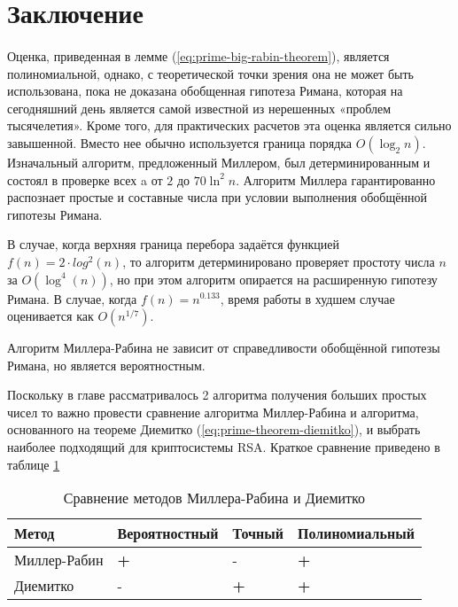 \section{Заключение}

\paragraph{} Оценка, приведенная в лемме (\ref{eq:prime-big-rabin-theorem}), является полиномиальной, однако, с теоретической точки зрения она не может быть использована, пока не доказана обобщенная гипотеза Римана, которая на сегодняшний день является самой известной из нерешенных «проблем тысячелетия». Кроме того, для практических расчетов эта оценка является сильно завышенной. Вместо нее обычно используется граница порядка $O(\log_{2}{n})$. Изначальный алгоритм, предложенный Миллером, был детерминированным и состоял в проверке всех a от $2$ до $70 \ln^{2}n$. Алгоритм Миллера гарантированно распознает простые и составные числа при условии выполнения обобщённой гипотезы Римана. 

  В случае, когда верхняя граница перебора задаётся функцией $f(n)=2 \cdot log^{2}(n)$, то алгоритм детерминировано проверяет простоту числа $n$ за
$O(\log^{4}(n))$, но при этом алгоритм опирается на расширенную гипотезу Римана. В случае, когда $f(n)=n^{0.133}$, время работы в худшем случае оценивается как $O(n^{1/7})$.

  Алгоритм Миллера-Рабина не зависит от справедливости обобщённой гипотезы Римана, но является вероятностным.

  Поскольку в главе рассматривалось 2 алгоритма получения больших простых чисел то важно провести сравнение алгоритма Миллер-Рабина и алгоритма, основанного на теореме Диемитко (\ref{eq:prime-theorem-diemitko}), и выбрать наиболее подходящий для криптосистемы RSA. Краткое сравнение приведено в таблице \ref{prime-compare-label}

  \begin{table}[h]
    \centering
    \begin{tabular}{|l|l|l|l|}   
        \hline 
        \textbf{Метод} & \textbf{Вероятностный} & \textbf{Точный} & \textbf{Полиномиальный} \\ \hline        
        Миллер-Рабин        & \textbf{+}           & -                & \textbf{+}              \\ \hline
        Диемитко            & -           & \textbf{+}                 & \textbf{+}              \\ \hline        
    \end{tabular} 
    \caption{Сравнение методов Миллера-Рабина и Диемитко}
    \label{prime-compare-label}
  \end{table}

